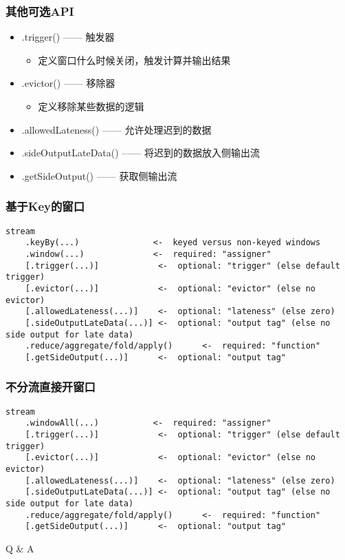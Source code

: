 \documentclass{beamer}
\begin{document}
  \begin{frame}
      \frametitle{其他可选API}
  
      \begin{itemize}
          \item .trigger() —— 触发器
          \begin{itemize}
              \item 定义窗口什么时候关闭，触发计算并输出结果
          \end{itemize}
          \item .evictor() —— 移除器
          \begin{itemize}
              \item 定义移除某些数据的逻辑
          \end{itemize}
          \item .allowedLateness() —— 允许处理迟到的数据
          \item .sideOutputLateData() —— 将迟到的数据放入侧输出流
          \item .getSideOutput() —— 获取侧输出流
      \end{itemize}
  
  \end{frame}

  \begin{frame}[fragile]
      \frametitle{基于Key的窗口}
  
\begin{verbatim}
stream
    .keyBy(...)               <-  keyed versus non-keyed windows
    .window(...)              <-  required: "assigner"
    [.trigger(...)]            <-  optional: "trigger" (else default trigger)
    [.evictor(...)]            <-  optional: "evictor" (else no evictor)
    [.allowedLateness(...)]    <-  optional: "lateness" (else zero)
    [.sideOutputLateData(...)] <-  optional: "output tag" (else no side output for late data)
    .reduce/aggregate/fold/apply()      <-  required: "function"
    [.getSideOutput(...)]      <-  optional: "output tag"
\end{verbatim}
  
  \end{frame}

  \begin{frame}[fragile]
      \frametitle{不分流直接开窗口}
  
\begin{verbatim}
stream
    .windowAll(...)           <-  required: "assigner"
    [.trigger(...)]            <-  optional: "trigger" (else default trigger)
    [.evictor(...)]            <-  optional: "evictor" (else no evictor)
    [.allowedLateness(...)]    <-  optional: "lateness" (else zero)
    [.sideOutputLateData(...)] <-  optional: "output tag" (else no side output for late data)
    .reduce/aggregate/fold/apply()      <-  required: "function"
    [.getSideOutput(...)]      <-  optional: "output tag"
\end{verbatim}
  
  \end{frame}

  \begin{frame}[plain,c]
    
    \begin{center}
    \Huge Q \& A
    \end{center}
    
  \end{frame}
\end{document}
